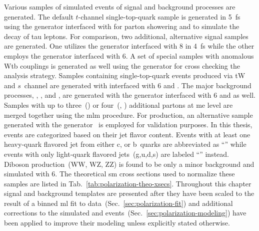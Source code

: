 
Various samples of simulated events of signal and background processes are generated. The default $t$-channel single-top-quark sample is generated in 5~\gls{fs} using the \POWHEG generator interfaced with  for parton showering and \TAUOLA to simulate the decay of tau leptons. For comparison, two additional, alternative signal samples are generated. One utilizes the \AMC generator interfaced with \PYTHIA{}8 in 4~\gls{fs} while the other employs the \COMPHEP generator interfaced with \PYTHIA{}6. A set of special samples with anomalous Wtb couplings is generated as well using the \COMPHEP generator for cross checking the analysis strategy. Samples containing single-top-quark events produced via tW and $s$~channel are generated with \POWHEG interfaced with \PYTHIA{}6 and \TAUOLA. The major background processes, \wjets, \zjets, and \ttbar, are generated with the \MG generator interfaced with \PYTHIA{}6 and \TAUOLA as well. Samples with up to three~(\ttbar) or four~(\wjets, \zjets) additional partons at \gls{me} level are merged together using the \gls{mlm} procedure. For \wjets production, an alternative sample generated with the \SHERPA[format=hyperbf] generator~\cite{Hoeche:2012ft} is employed for validation purposes. In this thesis, \wjets events are categorized based on their jet flavor content. Events with at least one heavy-quark flavored jet from either c, or b~quarks are abbreviated as ``'' while events with only light-quark flavored jets~(g,u,d,s) are labeled ``'' instead. Diboson production~(WW, WZ, ZZ) is found to be only a minor background and simulated with \PYTHIA{}6. The theoretical \gls{sm} cross sections used to normalize these samples are listed in Tab.~\ref{tab:polarization-theo-xsecs}. Throughout this chapter signal and background templates are presented after they have been scaled to the result of a binned \gls{ml} fit to data~(Sec.~\ref{sec:polarization-fit}) and additional corrections to the simulated \wjets and \ttbar events~(Sec.~\ref{sec:polarization-modeling}) have been applied to improve their modeling unless explicitly stated otherwise.

